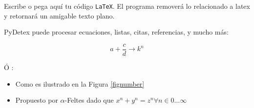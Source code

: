 Escribe o pega aquí tu código \texttt{LaTeX}. El programa removerá lo relacionado a latex y retornará un amigable texto plano. %

PyDetex puede procesar ecuaciones, listas, citas, referencias, y mucho más:

\begin{equation}
    a + \frac{c}{d} \longrightarrow k^n
\end{equation}

Ó :

\begin{itemize}[font=\bfseries]
    \item Como es ilustrado en la Figura \ref{fignumber}
    \item Propuesto por $\alpha$-Feltes \cite{feltes2008} dado que $x^n + y^n = z^n \forall n \in 0 \ldots \infty$
\end{itemize}